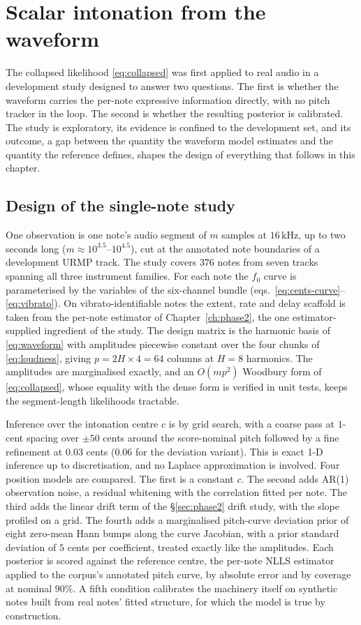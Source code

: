 \section{Scalar intonation from the waveform}
\label{sec:phase3-study}

The collapsed likelihood \eqref{eq:collapsed} was first applied to real
audio in a development study designed to answer two questions. The first is
whether the waveform carries the per-note expressive information directly,
with no pitch tracker in the loop. The second is whether the resulting
posterior is calibrated. The study is exploratory, its evidence is confined
to the development set, and its outcome, a gap between the quantity the
waveform model estimates and the quantity the reference defines, shapes the
design of everything that follows in this chapter.

\subsection{Design of the single-note study}

One observation is one note's audio segment of $m$ samples at $16$\,kHz, up
to two seconds long ($m \approx 10^{3.5}$--$10^{4.5}$), cut at the annotated
note boundaries of a development URMP track. The study covers $376$ notes
from seven tracks spanning all three instrument families. For each note the
$f_0$ curve is parameterised by the variables of the six-channel bundle
(eqs.~\eqref{eq:cents-curve}--\eqref{eq:vibrato}). On vibrato-identifiable
notes the extent, rate and delay scaffold is taken from the per-note
estimator of Chapter~\ref{ch:phase2}, the one estimator-supplied ingredient
of the study. The design matrix is the harmonic basis of \eqref{eq:waveform}
with amplitudes piecewise constant over the four chunks of
\eqref{eq:loudness}, giving $p = 2H \times 4 = 64$ columns at $H=8$
harmonics. The amplitudes are marginalised exactly, and an $O(mp^{2})$
Woodbury form of \eqref{eq:collapsed}, whose equality with the dense form is
verified in unit tests, keeps the segment-length likelihoods tractable.

Inference over the intonation centre $c$ is by grid search, with a coarse
pass at $1$-cent spacing over $\pm 50$ cents around the score-nominal pitch
followed by a fine refinement at $0.03$ cents ($0.06$ for the deviation
variant). This is exact 1-D inference up to discretisation, and no Laplace
approximation is involved. Four position models are compared. The first is a
constant $c$. The second adds AR(1) observation noise, a residual whitening
with the correlation fitted per note. The third adds the linear drift term
of the \S\ref{sec:phase2} drift study, with the slope profiled on a grid.
The fourth adds a marginalised pitch-curve deviation prior of eight
zero-mean Hann bumps along the curve Jacobian, with a prior standard
deviation of $5$ cents per coefficient, treated exactly like the amplitudes.
Each posterior is scored against the reference centre, the per-note NLLS
estimator applied to the corpus's annotated pitch curve, by absolute error
and by coverage at nominal $90\%$. A fifth condition calibrates the
machinery itself on synthetic notes built from real notes' fitted structure,
for which the model is true by construction.

